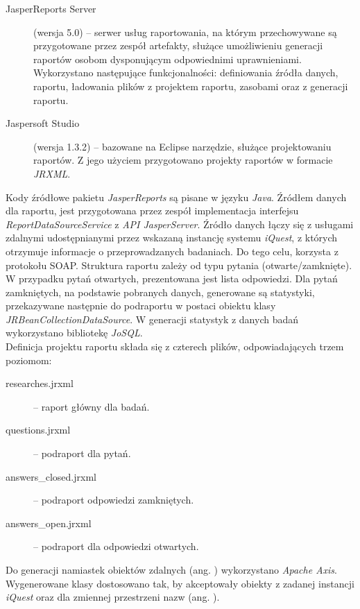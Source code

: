 \begin{description}
\item[JasperReports Server] (wersja 5.0) -- serwer usług raportowania, na którym przechowywane są przygotowane przez zespół artefakty, służące umożliwieniu generacji raportów osobom dysponującym odpowiednimi uprawnieniami. Wykorzystano następujące funkcjonalności: definiowania źródła danych, raportu, ładowania plików z projektem raportu, zasobami oraz z generacji raportu.
\item[Jaspersoft Studio] (wersja 1.3.2) -- bazowane na Eclipse narzędzie, służące projektowaniu raportów. Z jego użyciem przygotowano projekty raportów w formacie \textit{JRXML}.
\end{description}

Kody źródłowe pakietu \textit{JasperReports} są pisane w języku \textit{Java}. Źródłem danych dla raportu, jest przygotowana przez zespół implementacja interfejsu \textit{ReportDataSourceService} z \textit{API JasperServer}. Źródło danych łączy się z usługami zdalnymi udostępnianymi przez wskazaną instancję systemu \textit{iQuest}, z których otrzymuje informacje o przeprowadzanych badaniach. Do tego celu, korzysta z protokołu SOAP. Struktura raportu zależy od typu pytania (otwarte\slash zamknięte). W przypadku pytań otwartych, prezentowana jest lista odpowiedzi. Dla pytań zamkniętych, na podstawie pobranych danych, generowane są statystyki, przekazywane następnie do podraportu w postaci obiektu klasy \textit{JRBeanCollectionDataSource}. W generacji statystyk z danych badań wykorzystano bibliotekę \textit{JoSQL}. \\

Definicja projektu raportu składa się z czterech plików, odpowiadających trzem poziomom:

\begin{description}
\item[researches.jrxml] -- raport główny dla badań.
\item[questions.jrxml] -- podraport dla pytań.
\item[answers\_closed.jrxml] -- podraport odpowiedzi zamkniętych.
\item[answers\_open.jrxml] -- podraport dla odpowiedzi otwartych.
\end{description}

Do generacji namiastek obiektów zdalnych (ang. ) wykorzystano \textit{Apache Axis}. Wygenerowane klasy dostosowano tak, by akceptowały obiekty z zadanej instancji \textit{iQuest} oraz dla zmiennej przestrzeni nazw (ang. ). \\

